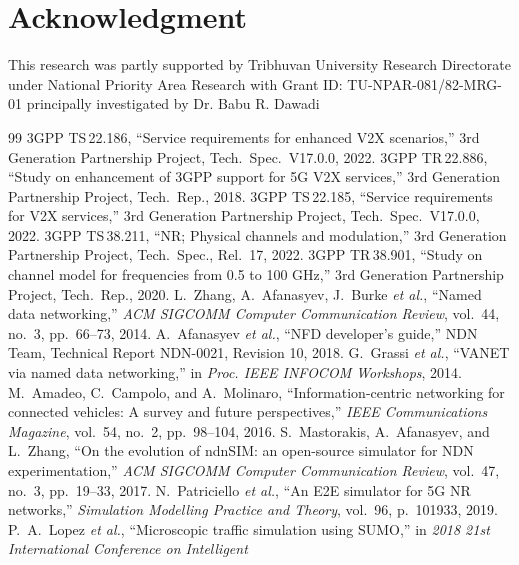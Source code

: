 \documentclass[journal]{IEEEtran}
\begin{document}
\section*{Acknowledgment}
This research was partly supported by Tribhuvan University Research Directorate under National Priority Area Research with Grant ID: TU-NPAR-081/82-MRG-01 principally investigated by Dr. Babu R. Dawadi


\begin{thebibliography}{99}
3GPP TS\,22.186, ``Service requirements for enhanced V2X scenarios,''
3rd Generation Partnership Project, Tech.\ Spec.\ V17.0.0, 2022.
3GPP TR\,22.886, ``Study on enhancement of 3GPP support for 5G V2X
services,'' 3rd Generation Partnership Project, Tech.\ Rep., 2018.
3GPP TS\,22.185, ``Service requirements for V2X services,''
3rd Generation Partnership Project, Tech.\ Spec.\ V17.0.0, 2022.
3GPP TS\,38.211, ``NR; Physical channels and modulation,''
3rd Generation Partnership Project, Tech.\ Spec., Rel.\ 17, 2022.
3GPP TR\,38.901, ``Study on channel model for frequencies from 0.5 to
100 GHz,'' 3rd Generation Partnership Project, Tech.\ Rep., 2020.
L.~Zhang, A.~Afanasyev, J.~Burke \emph{et al.}, ``Named data networking,''
\emph{ACM SIGCOMM Computer Communication Review}, vol.~44, no.~3,
pp.~66--73, 2014.
A.~Afanasyev \emph{et al.},
``NFD developer's guide,''
NDN Team, Technical Report NDN-0021, Revision 10, 2018.
G.~Grassi \emph{et al.}, ``VANET via named data networking,'' in
\emph{Proc. IEEE INFOCOM Workshops}, 2014.
M.~Amadeo, C.~Campolo, and A.~Molinaro,
``Information-centric networking for connected vehicles: A survey and future perspectives,''
\emph{IEEE Communications Magazine},
vol.~54, no.~2, pp.~98--104, 2016.
S.~Mastorakis, A.~Afanasyev, and L.~Zhang, ``On the evolution of ndnSIM: 
an open-source simulator for NDN experimentation,'' 
\emph{ACM SIGCOMM Computer Communication Review}, vol.~47, no.~3, 
pp.~19--33, 2017.
N.~Patriciello \emph{et al.}, ``An E2E simulator for 5G NR networks,'' 
\emph{Simulation Modelling Practice and Theory}, vol.~96, p.~101933, 2019.
P.~A.~Lopez \emph{et al.}, ``Microscopic traffic simulation using
SUMO,'' in \emph{2018 21st International Conference on Intelligent
}
\end{thebibliography}
\end{document}
